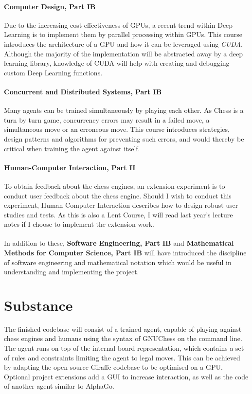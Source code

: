 \documentclass[a4paper]{article}
\begin{document}
\paragraph{Computer Design, Part IB} Due to the increasing cost-effectiveness of GPUs, a recent trend within Deep Learning is to implement them by parallel processing within GPUs. This course introduces the architecture of a GPU and how it can be leveraged using \textit{CUDA}. Although the majority of the implementation will be abstracted away by a deep learning library, knowledge of CUDA will help with creating and debugging custom Deep Learning functions.

\paragraph{Concurrent and Distributed Systems, Part IB} Many agents can be trained simultaneously by playing each other. As Chess is a turn by turn game, concurrency errors may result in a failed move, a simultaneous move or an erroneous move. This course introduces strategies, design patterns and algorithms for preventing such errors, and would thereby be critical when training the agent against itself.

\paragraph{Human-Computer Interaction, Part II} To obtain feedback about the chess engines, an extension experiment is to conduct user feedback about the chess engine. Should I wish to conduct this experiment, Human-Computer Interaction describes how to design robust user-studies and tests. As this is also a Lent Course, I will read last year's lecture notes if I choose to implement the extension work.

\paragraph{}In addition to these, \textbf{Software Engineering, Part IB} and \textbf{Mathematical Methods for Computer Science, Part IB} will have introduced the discipline of software engineering and mathematical notation which would be useful in understanding and implementing the project.


\section*{Substance}

\paragraph{}The finished codebase will consist of a trained agent, capable of playing against chess engines and humans using the syntax of GNUChess on the command line. The agent runs on top of the internal board representation, which contains a set of rules and constraints limiting the agent to legal moves. This can be achieved by adapting the open-source Giraffe codebase to be optimised on a GPU. Optional project extensions add a GUI to increase interaction, as well as the code of another agent similar to AlphaGo.
\end{document}
